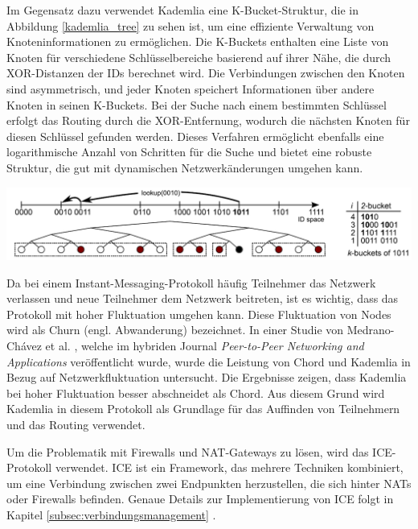 \noindent Im Gegensatz dazu verwendet Kademlia eine K-Bucket-Struktur, die in Abbildung \ref{kademlia_tree} zu sehen ist, um eine effiziente Verwaltung von Knoteninformationen zu ermöglichen. Die K-Buckets enthalten eine Liste von Knoten für verschiedene Schlüsselbereiche basierend auf ihrer Nähe, die durch XOR-Distanzen der IDs berechnet wird. Die Verbindungen zwischen den Knoten sind asymmetrisch, und jeder Knoten speichert Informationen über andere Knoten in seinen K-Buckets. Bei der Suche nach einem bestimmten Schlüssel erfolgt das Routing durch die XOR-Entfernung, wodurch die nächsten Knoten für diesen Schlüssel gefunden werden. Dieses Verfahren ermöglicht ebenfalls eine logarithmische Anzahl von Schritten für die Suche und bietet eine robuste Struktur, die gut mit dynamischen Netzwerkänderungen umgehen kann.

\begin{center}
    \captionsetup{type=figure}
    \includegraphics[width=0.9\linewidth]{images/kademlia_tree.png}
    \label{kademlia_tree}
\end{center}


\noindent Da bei einem Instant-Messaging-Protokoll häufig Teilnehmer das Netzwerk verlassen und neue Teilnehmer dem Netzwerk beitreten, ist es wichtig, dass das Protokoll mit hoher Fluktuation umgehen kann. Diese Fluktuation von Nodes wird als Churn (engl. Abwanderung) bezeichnet. In einer Studie von Medrano-Chávez et al. \parencite{MedranoChavez_ChordKademliaHighChurnScenarios}, welche im hybriden Journal \textit{Peer-to-Peer Networking and Applications} veröffentlicht wurde, wurde die Leistung von Chord und Kademlia in Bezug auf Netzwerkfluktuation untersucht. Die Ergebnisse zeigen, dass Kademlia bei hoher Fluktuation besser abschneidet als Chord. Aus diesem Grund wird Kademlia in diesem Protokoll als Grundlage für das Auffinden von Teilnehmern und das Routing verwendet.

Um die Problematik mit Firewalls und NAT-Gateways zu lösen, wird das ICE-Protokoll verwendet. ICE ist ein Framework, das mehrere Techniken kombiniert, um eine Verbindung zwischen zwei Endpunkten herzustellen, die sich hinter NATs oder Firewalls befinden. Genaue Details zur Implementierung von ICE folgt in Kapitel \ref{subsec:verbindungsmanagement} \textit{}.


